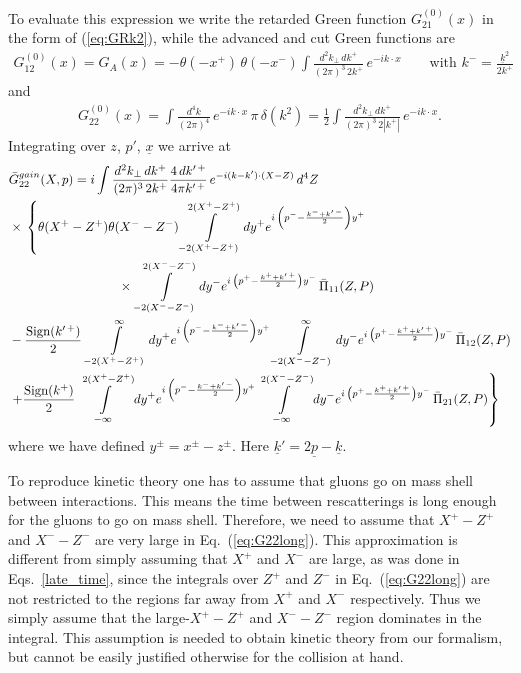 \documentclass[onecolumn,showpacs,nobibnotes,nofootinbib,12pt,aps,prd,showpacs,notitlepage,nofootinbib,preprintnumbers,amsmath,amssymb]{article}
\def\eq#1{{Eq.~(\ref{#1})}}
\newcommand{\un}[1]{\underline{#1}}
\begin{document}
To evaluate this expression we write the retarded Green function
$G^{(0)}_{21}(x)$ in the form of (\ref{eq:GRk2}), while the advanced
and cut Green functions are
\begin{align}
  G^{(0)}_{12}(x)= G_A(x)=-\theta(-x^+) \, \theta(-x^-) \int \frac{d^2
    k_\perp \, d k^+}{(2\pi)^3 \, 2k^+} \, e^{-ik\cdot
    x}\qquad\text{with $k^-=\frac{\underline{k}^2}{2
      k^+}$}\label{eq:GAk2}
\end{align}
and
\begin{align}
  G^{(0)}_{22}(x)= \int \frac{d^4 k}{(2 \pi)^4} \, e^{-ik\cdot x} \,
  \pi \, \delta (k^2) = \frac{1}{2} \int \frac{d^2 k_\perp \, d
    k^+}{(2\pi)^3 \, 2 |k^+|} \, e^{-ik\cdot x} .\label{eq:Gcut}
\end{align}
Integrating over $z$, $p'$, $\un{x}$ we arrive at
\begin{align}
  \label{eq:G22long}
  & \bar G_{22}^{gain}(X,p)=i \int \frac{d^2 k_\perp \, d
    k^+}{(2\pi)^3 \, 2k^+} \frac{4 \, d k^{\prime \, +}}{4 \pi
    k^{\prime \, +}} \, e^{-i (k-k') \cdot (X-Z)} \, d^4 Z \\ & \times
  \, \left\{ \theta (X^+ - Z^+) \theta (X^- - Z^-) \int\limits_{-2
      (X^+ - Z^+)}^{2 (X^+ - Z^+)} d y^+ e^{i \, \left(p^--\frac{k^-+
          k^{\prime \, -}}{2}\right) y^+ } \right.  \notag \\ &
  \hspace*{3cm} \times \, \int\limits_{-2 (X^- - Z^-)}^{2 (X^- - Z^-)}
  d y^- e^{i \, \left(p^+ - \frac{k^+ + k^{\prime \, +}}{2}\right)
    y^-} \, \bar\Pi_{11} (Z,P) \notag \\ & - \frac{\mbox{Sign}
    (k^{\prime \, +})}{2} \, \int\limits_{-2 (X^+ - Z^+)}^{\infty} d
  y^+ e^{i \, \left(p^--\frac{k^-+ k^{\prime \, -}}{2}\right) y^+ }
  \int\limits_{-2 (X^- - Z^-)}^{\infty} d y^- e^{i \, \left(p^+ -
      \frac{k^+ + k^{\prime \, +}}{2}\right) y^-} \, \bar\Pi_{12}
  (Z,P) \notag \\ & \left. + \frac{\mbox{Sign} (k^{+})}{2} \,
    \int\limits_{-\infty}^{2 (X^+ - Z^+)} d y^+ e^{i \,
      \left(p^--\frac{k^-+ k^{\prime \, -}}{2}\right) y^+ }
    \int\limits_{-\infty}^{2 (X^- - Z^-)} d y^- e^{i \, \left(p^+ -
        \frac{k^+ + k^{\prime \, +}}{2}\right) y^-} \, \bar\Pi_{21}
    (Z,P) \right\} \notag
\end{align}
where we have defined $y^\pm = x^\pm - z^\pm$. Here $\un{k}' = 2
\un{p} - \un{k}$.

To reproduce kinetic theory one has to assume that gluons go on mass
shell between interactions. This means the time between rescatterings
is long enough for the gluons to go on mass shell. Therefore, we need
to assume that $X^+ - Z^+$ and $X^- - Z^-$ are very large in
\eq{eq:G22long}. This approximation is different from simply assuming
that $X^+$ and $X^-$ are large, as was done in Eqs.~\eqref{late_time},
since the integrals over $Z^+$ and $Z^-$ in \eq{eq:G22long} are not
restricted to the regions far away from $X^+$ and $X^-$
respectively. Thus we simply assume that the large-$X^+ - Z^+$ and
$X^- - Z^-$ region dominates in the integral. This assumption is
needed to obtain kinetic theory from our formalism, but cannot be
easily justified otherwise for the collision at hand.
\end{document}
